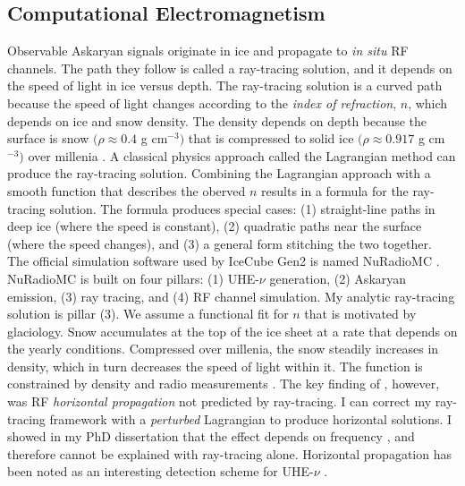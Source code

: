 \documentclass[../../../main.tex]{subfiles}
\begin{document}
\subsection{Computational Electromagnetism}
\label{sec:cem}

Observable Askaryan signals originate in ice and propagate to \textit{in situ} RF channels.  The path they follow is called a ray-tracing solution, and it depends on the speed of light in ice versus depth.  The ray-tracing solution is a curved path because the speed of light changes according to the \textit{index of refraction}, $n$, which depends on ice and snow density.  The density depends on depth because the surface is snow $(\rho \approx 0.4$ g cm$^{-3})$ that is compressed to solid ice $(\rho \approx 0.917$ g cm$^{-3})$ over millenia \cite{10.3189/2015jog14j214}.  A classical physics approach called the Lagrangian method can produce the ray-tracing solution. Combining the Lagrangian approach with a smooth function that describes the oberved $n$ results in a formula for the ray-tracing solution.  The formula produces special cases: (1) straight-line paths in deep ice (where the speed is constant), (2) quadratic paths near the surface (where the speed changes), and (3) a general form stitching the two together.
\\
\vspace{0.25cm}
The official simulation software used by IceCube Gen2 is named NuRadioMC \cite{10.1140/epjc/s10052-020-7612-8}.  NuRadioMC is built on four pillars: (1) UHE-$\nu$ generation, (2) Askaryan emission, (3) ray tracing, and (4) RF channel simulation.  My analytic ray-tracing solution is pillar (3).  We assume a functional fit for $n$ that is motivated by glaciology.  Snow accumulates at the top of the ice sheet at a rate that depends on the yearly conditions.  Compressed over millenia, the snow steadily increases in density, which in turn decreases the speed of light within it.  The function is constrained by density and radio measurements \cite{Barwick:2018497}.  The key finding of \cite{Barwick:2018497}, however, was RF \textit{horizontal propagation} not predicted by ray-tracing.  I can correct my ray-tracing framework with a \textit{perturbed} Lagrangian to produce horizontal solutions.  I showed in my PhD dissertation that the effect depends on frequency \cite{hanson}, and therefore cannot be explained with ray-tracing alone.  Horizontal propagation has been noted as an interesting detection scheme for UHE-$\nu$ \cite{10.1103/physrevd.71.011503}.
\\
\end{document}
